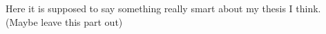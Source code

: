Here it is supposed to say something really smart about my thesis I think. (Maybe leave this part out)
